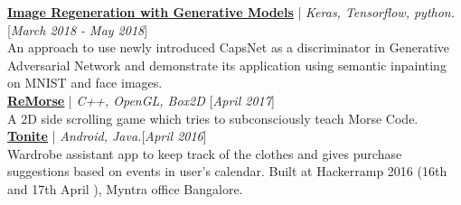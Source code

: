 \documentclass[10pt]{article}
\renewcommand{\textbf}[1]{{\bfseries\color{accent_darkest}#1}}
\begin{document}
\textbf{\underline{\href{https://github.com/RaghavaDhanya/Rudolf}
{Image Regeneration with Generative Models}}} | \textit{Keras, Tensorflow, python.}\hfill\textcolor{grey_darker}{[\textit{March 2018 - May 2018}]}\\
An approach to use newly introduced CapsNet as a discriminator in Generative Adversarial Network and demonstrate its application using semantic inpainting on MNIST and face images.
\smallskip
\\
\textbf{\underline{\href{https://github.com/RaghavaDhanya/ReMorse}
{ReMorse}}}  | \textit{C++, OpenGL, Box2D} \hfill\textcolor{grey_darker}{[\textit{April 2017}]}
\\
A 2D side scrolling game which tries to subconsciously teach Morse Code.
\smallskip
\\
\textbf{\underline{\href{https://github.com/abhijith0505/Tonite}
{Tonite}}} | \textit{Android, Java.}\hfill\textcolor{grey_darker}{[\textit{April 2016}]}\\
Wardrobe assistant app to keep track of the clothes and gives purchase
suggestions based on events in user's calendar. Built at Hackerramp
2016 (16th and 17th April ), Myntra office Bangalore.

\end{document}
